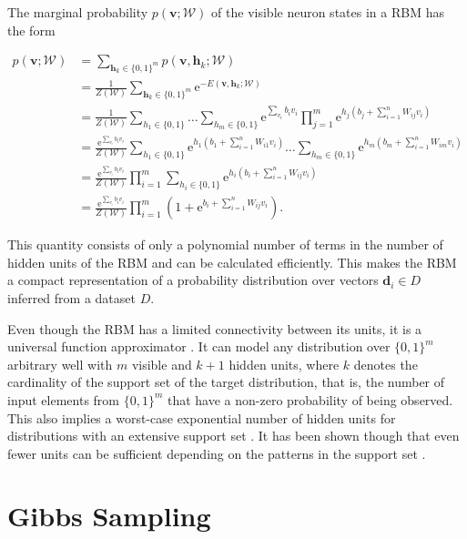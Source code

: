 The marginal probability $p(\bm{v};\mathcal{W})$ of the visible neuron states in a RBM has the form

\begin{align}
   p(\bm{v};\mathcal{W}) &= \sum_{\bm{h}_k \in \{0,1\}^m} p(\bm{v},\bm{h}_k;\mathcal{W})\\
   &= \frac{1}{Z(\mathcal{W})}\sum_{\bm{h}_k \in \{0,1\}^m} \mathrm{e}^{-E(\bm{v}, \bm{h}_k;\mathcal{W})}\\
   &= \frac{1}{Z(\mathcal{W})}\sum_{h_1\in \{0,1\}}\dots\sum_{h_m \in \{0,1\}}\mathrm{e}^{\sum_{v_i}b_iv_i}\prod_{j=1}^m\mathrm{e}^{h_j(b_j + \sum_{i=1}^nW_{ij}v_i)}\\
   &= \frac{\mathrm{e}^{\sum_{v_i}b_iv_i}}{Z(\mathcal{W})}\sum_{h_1 \in \{0,1\}}\mathrm{e}^{h_1(b_1 + \sum_{i=1}^nW_{i1}v_i)}\dots\sum_{h_m \in \{0,1\}}\mathrm{e}^{h_m(b_m + \sum_{i=1}^nW_{im}v_i)}\\
   &= \frac{\mathrm{e}^{\sum_{v_i}b_iv_i}}{Z(\mathcal{W})}\prod_{i=1}^m\sum_{h_i \in \{0,1\}}\mathrm{e}^{h_i(b_i + \sum_{i=1}^nW_{ij}v_i)}\\
   \label{eq:rbm}
   &= \frac{\mathrm{e}^{\sum_{v_i}b_iv_i}}{Z(\mathcal{W})}\prod_{i=1}^m(1+\mathrm{e}^{b_i + \sum_{i=1}^nW_{ij}v_i}).
\end{align}

This quantity consists of only a polynomial number of terms in the number of hidden units of the RBM and can be calculated efficiently. This makes the RBM a compact representation of a probability distribution over vectors $\bm{d}_i \in D$ inferred from a dataset $D$.

Even though the RBM has a limited connectivity between its units, it is a universal function approximator \cite{le2008representational}.
It can model any distribution over $\{0,1\}^m$ arbitrary well with $m$ visible and $k+1$ hidden units, where 
$k$ denotes the cardinality of the support set of the target distribution, that is, the number of input elements
from $\{0,1\}^m$ that have a non-zero probability of being observed. This also implies a worst-case 
exponential number of hidden units for distributions with an extensive support set \cite{le2008representational}. It has been shown though that even fewer units can be sufficient depending on the patterns in the support set \cite{montufar2011refinements}.

\section{Gibbs Sampling}
\label{sec:gibbsSampling}

